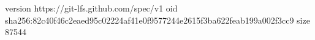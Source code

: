 version https://git-lfs.github.com/spec/v1
oid sha256:82c40f46c2eaed95c02224af41e0f9577244e2615f3ba622feab199a002f3cc9
size 87544
